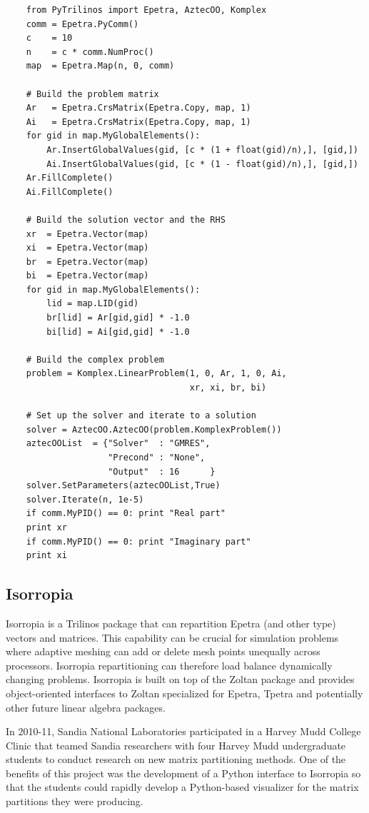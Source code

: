 \documentclass[11pt]{article}
\begin{document}
\begin{verbatim}
    from PyTrilinos import Epetra, AztecOO, Komplex
    comm = Epetra.PyComm()
    c    = 10
    n    = c * comm.NumProc()
    map  = Epetra.Map(n, 0, comm)

    # Build the problem matrix
    Ar   = Epetra.CrsMatrix(Epetra.Copy, map, 1)
    Ai   = Epetra.CrsMatrix(Epetra.Copy, map, 1)
    for gid in map.MyGlobalElements():
        Ar.InsertGlobalValues(gid, [c * (1 + float(gid)/n),], [gid,])
        Ai.InsertGlobalValues(gid, [c * (1 - float(gid)/n),], [gid,])
    Ar.FillComplete()
    Ai.FillComplete()

    # Build the solution vector and the RHS
    xr  = Epetra.Vector(map)
    xi  = Epetra.Vector(map)
    br  = Epetra.Vector(map)
    bi  = Epetra.Vector(map)
    for gid in map.MyGlobalElements():
        lid = map.LID(gid)
        br[lid] = Ar[gid,gid] * -1.0
        bi[lid] = Ai[gid,gid] * -1.0

    # Build the complex problem
    problem = Komplex.LinearProblem(1, 0, Ar, 1, 0, Ai,
                                    xr, xi, br, bi)

    # Set up the solver and iterate to a solution
    solver = AztecOO.AztecOO(problem.KomplexProblem())
    aztecOOList  = {"Solver"  : "GMRES",
                    "Precond" : "None",
                    "Output"  : 16      }
    solver.SetParameters(aztecOOList,True)
    solver.Iterate(n, 1e-5)
    if comm.MyPID() == 0: print "Real part"
    print xr
    if comm.MyPID() == 0: print "Imaginary part"
    print xi
\end{verbatim}

\subsection{Isorropia}
\label{sec:isorropia}

Isorropia is a Trilinos package that can repartition Epetra (and other type) vectors and matrices.  This capability can be crucial for simulation problems where adaptive meshing can add or delete mesh points unequally across processors.  Isorropia repartitioning can therefore load balance dynamically changing problems.  Isorropia is built on top of the Zoltan package and provides object-oriented interfaces to Zoltan specialized for Epetra, Tpetra and potentially other future linear algebra packages.

In 2010-11, Sandia National Laboratories participated in a Harvey Mudd College Clinic that teamed Sandia researchers with four Harvey Mudd undergraduate students to conduct research on new matrix partitioning methods.  One of the benefits of this project was the development of a Python interface to Isorropia so that the students could rapidly develop a Python-based visualizer for the matrix partitions they were producing.
\end{document}
